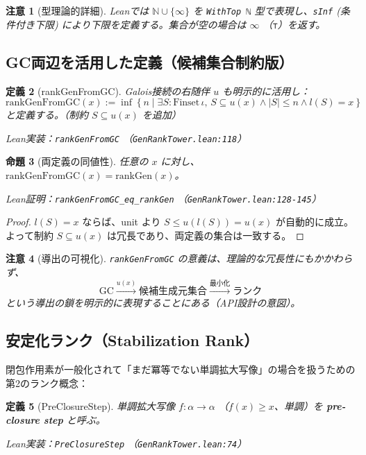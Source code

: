 \documentclass[a4paper,12pt]{ltjsarticle}
\newtheorem{definition}{定義}[section]
\newtheorem{proposition}[definition]{命題}
\newtheorem{remark}[definition]{注意}
\newcommand{\N}{\mathbb{N}}
\newcommand{\Lean}[1]{\texttt{\color{blue}#1}}
\begin{document}
\begin{remark}[型理論的詳細]
Leanでは $\N \cup \{\infty\}$ を \texttt{WithTop ℕ} 型で表現し、\texttt{sInf} (条件付き下限) により下限を定義する。集合が空の場合は $\infty$ （\texttt{⊤}）を返す。
\end{remark}

\subsection{GC両辺を活用した定義（候補集合制約版）}

\begin{definition}[rankGenFromGC]
Galois接続の右随伴 $u$ も明示的に活用し：
\[
  \mathrm{rankGenFromGC}(x) := \inf \left\{ n \mid \exists S : \mathrm{Finset}\, \iota,\, S \subseteq u(x) \land |S| \le n \land l(S) = x \right\}
\]
と定義する。（制約 $S \subseteq u(x)$ を追加）

Lean実装：\Lean{rankGenFromGC} （\texttt{GenRankTower.lean:118}）
\end{definition}

\begin{proposition}[両定義の同値性]
任意の $x$ に対し、$\mathrm{rankGenFromGC}(x) = \mathrm{rankGen}(x)$。

Lean証明：\Lean{rankGenFromGC\_eq\_rankGen} （\texttt{GenRankTower.lean:128-145}）
\end{proposition}

\begin{proof}
$l(S) = x$ ならば、unit より $S \le u(l(S)) = u(x)$ が自動的に成立。よって制約 $S \subseteq u(x)$ は冗長であり、両定義の集合は一致する。
\end{proof}

\begin{remark}[導出の可視化]
\texttt{rankGenFromGC} の意義は、理論的な冗長性にもかかわらず、
\[
  \text{GC} \xrightarrow{u(x)} \text{候補生成元集合} \xrightarrow{\text{最小化}} \text{ランク}
\]
という導出の鎖を明示的に表現することにある（API設計の意図）。
\end{remark}

\subsection{安定化ランク（Stabilization Rank）}

閉包作用素が一般化されて「まだ冪等でない単調拡大写像」の場合を扱うための第2のランク概念：

\begin{definition}[PreClosureStep]
単調拡大写像 $f : \alpha \to \alpha$ （$f(x) \ge x$、単調）を \textbf{pre-closure step} と呼ぶ。

Lean実装：\Lean{PreClosureStep} （\texttt{GenRankTower.lean:74}）
\end{definition}
\end{document}
